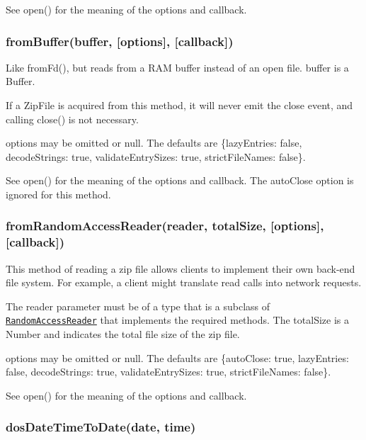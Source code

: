 See {\ttfamily open()} for the meaning of the options and callback.

\subsubsection*{from\+Buffer(buffer, \mbox{[}options\mbox{]}, \mbox{[}callback\mbox{]})}

Like {\ttfamily from\+Fd()}, but reads from a R\+AM buffer instead of an open file. {\ttfamily buffer} is a {\ttfamily Buffer}.

If a {\ttfamily Zip\+File} is acquired from this method, it will never emit the {\ttfamily close} event, and calling {\ttfamily close()} is not necessary.

{\ttfamily options} may be omitted or {\ttfamily null}. The defaults are {\ttfamily \{lazy\+Entries\+: false, decode\+Strings\+: true, validate\+Entry\+Sizes\+: true, strict\+File\+Names\+: false\}}.

See {\ttfamily open()} for the meaning of the options and callback. The {\ttfamily auto\+Close} option is ignored for this method.

\subsubsection*{from\+Random\+Access\+Reader(reader, total\+Size, \mbox{[}options\mbox{]}, \mbox{[}callback\mbox{]})}

This method of reading a zip file allows clients to implement their own back-\/end file system. For example, a client might translate read calls into network requests.

The {\ttfamily reader} parameter must be of a type that is a subclass of \href{#class-randomaccessreader}{\tt Random\+Access\+Reader} that implements the required methods. The {\ttfamily total\+Size} is a Number and indicates the total file size of the zip file.

{\ttfamily options} may be omitted or {\ttfamily null}. The defaults are {\ttfamily \{auto\+Close\+: true, lazy\+Entries\+: false, decode\+Strings\+: true, validate\+Entry\+Sizes\+: true, strict\+File\+Names\+: false\}}.

See {\ttfamily open()} for the meaning of the options and callback.

\subsubsection*{dos\+Date\+Time\+To\+Date(date, time)}

